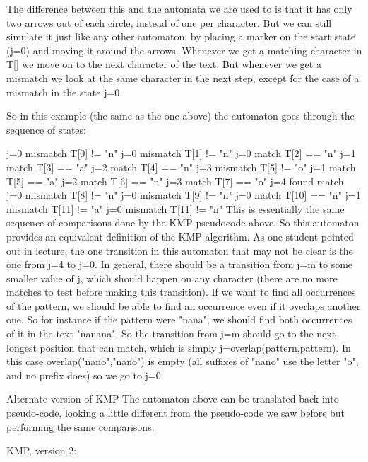 The difference between this and the automata we are used to is that it has only two arrows out of each circle, instead of one per character. But we can still simulate it just like any other automaton, by placing a marker on the start state (j=0) and moving it around the arrows. Whenever we get a matching character in T[] we move on to the next character of the text. But whenever we get a mismatch we look at the same character in the next step, except for the case of a mismatch in the state j=0.

So in this example (the same as the one above) the automaton goes through the sequence of states:

    j=0
            mismatch T[0] != "n"
    j=0
            mismatch T[1] != "n"
    j=0
            match T[2] == "n"
    j=1
            match T[3] == "a"
    j=2
            match T[4] == "n"
    j=3
            mismatch T[5] != "o"
    j=1
            match T[5] == "a"
    j=2
            match T[6] == "n"
    j=3
            match T[7] == "o"
    j=4
            found match
    j=0
            mismatch T[8] != "n"
    j=0
            mismatch T[9] != "n"
    j=0
            match T[10] == "n"
    j=1
            mismatch T[11] != "a"
    j=0
            mismatch T[11] != "n"
This is essentially the same sequence of comparisons done by the KMP pseudocode above. So this automaton provides an equivalent definition of the KMP algorithm. As one student pointed out in lecture, the one transition in this automaton that may not be clear is the one from j=4 to j=0. In general, there should be a transition from j=m to some smaller value of j, which should happen on any character (there are no more matches to test before making this transition). If we want to find all occurrences of the pattern, we should be able to find an occurrence even if it overlaps another one. So for instance if the pattern were "nana", we should find both occurrences of it in the text "nanana". So the transition from j=m should go to the next longest position that can match, which is simply j=overlap(pattern,pattern). In this case overlap("nano","nano") is empty (all suffixes of "nano" use the letter "o", and no prefix does) so we go to j=0.

Alternate version of KMP
The automaton above can be translated back into pseudo-code, looking a little different from the pseudo-code we saw before but performing the same comparisons.

KMP, version 2:

